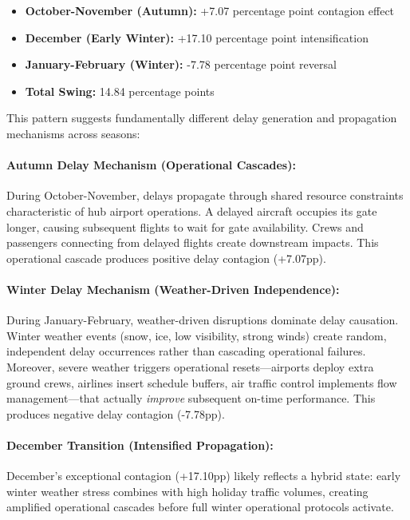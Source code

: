 \documentclass{report}
\begin{document}
\begin{itemize}
    \item \textbf{October-November (Autumn):} +7.07 percentage point contagion effect
    \item \textbf{December (Early Winter):} +17.10 percentage point intensification
    \item \textbf{January-February (Winter):} -7.78 percentage point reversal
    \item \textbf{Total Swing:} 14.84 percentage points
\end{itemize}

This pattern suggests fundamentally different delay generation and propagation mechanisms across seasons:

\paragraph{Autumn Delay Mechanism (Operational Cascades):} During October-November, delays propagate through shared resource constraints characteristic of hub airport operations. A delayed aircraft occupies its gate longer, causing subsequent flights to wait for gate availability. Crews and passengers connecting from delayed flights create downstream impacts. This operational cascade produces positive delay contagion (+7.07pp).

\paragraph{Winter Delay Mechanism (Weather-Driven Independence):} During January-February, weather-driven disruptions dominate delay causation. Winter weather events (snow, ice, low visibility, strong winds) create random, independent delay occurrences rather than cascading operational failures. Moreover, severe weather triggers operational resets—airports deploy extra ground crews, airlines insert schedule buffers, air traffic control implements flow management—that actually \textit{improve} subsequent on-time performance. This produces negative delay contagion (-7.78pp).

\paragraph{December Transition (Intensified Propagation):} December's exceptional contagion (+17.10pp) likely reflects a hybrid state: early winter weather stress combines with high holiday traffic volumes, creating amplified operational cascades before full winter operational protocols activate.
\end{document}
